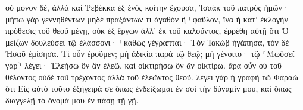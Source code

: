 \documentclass{openreader}
\begin{document}
οὐ μόνον δέ, ἀλλὰ καὶ Ῥεβέκκα ἐξ ἑνὸς κοίτην ἔχουσα, Ἰσαὰκ τοῦ πατρὸς ἡμῶν· 
μήπω γὰρ γεννηθέντων μηδὲ πραξάντων τι ἀγαθὸν ἢ ⸀φαῦλον, ἵνα ἡ κατ’ ἐκλογὴν πρόθεσις τοῦ θεοῦ μένῃ, 
οὐκ ἐξ ἔργων ἀλλ’ ἐκ τοῦ καλοῦντος, ἐρρέθη αὐτῇ ὅτι Ὁ μείζων δουλεύσει τῷ ἐλάσσονι· 
⸀καθὼς γέγραπται· Τὸν Ἰακὼβ ἠγάπησα, τὸν δὲ Ἠσαῦ ἐμίσησα. 
Τί οὖν ἐροῦμεν; μὴ ἀδικία παρὰ τῷ θεῷ; μὴ γένοιτο· 
τῷ ⸂Μωϋσεῖ γὰρ⸃ λέγει· Ἐλεήσω ὃν ἂν ἐλεῶ, καὶ οἰκτιρήσω ὃν ἂν οἰκτίρω. 
ἄρα οὖν οὐ τοῦ θέλοντος οὐδὲ τοῦ τρέχοντος ἀλλὰ τοῦ ἐλεῶντος θεοῦ. 
λέγει γὰρ ἡ γραφὴ τῷ Φαραὼ ὅτι Εἰς αὐτὸ τοῦτο ἐξήγειρά σε ὅπως ἐνδείξωμαι ἐν σοὶ τὴν δύναμίν μου, καὶ ὅπως διαγγελῇ τὸ ὄνομά μου ἐν πάσῃ τῇ γῇ. 
\end{document}
